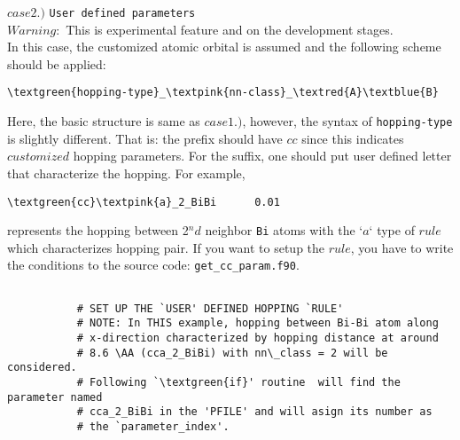\documentclass[a4paper,12pt]{scrartcl}
\newcommand{\textred}[1]{\textcolor{red!85!white}{\texttt{#1}}}
\newcommand{\textblue}[1]{\textcolor{blue!85!white}{\texttt{#1}}}
\newcommand{\textgreen}[1]{\textcolor{green!50!black}{\texttt{#1}}}
\newcommand{\textpink}[1]{\textcolor{red!60!yellow}{\texttt{#1}}}
\begin{document}
\begin{description}
		\subitem $case 2.)$  \texttt{User defined parameters} \\
		$Warning:$ This is experimental feature and on the development stages. \\
		In this case, the customized atomic orbital is assumed and the 
		following scheme should be applied:
        \begin{Verbatim}[commandchars=\\\{\}]
         \textgreen{hopping-type}_\textpink{nn-class}_\textred{A}\textblue{B}
        \end{Verbatim}
		Here, the basic structure is same as $case 1.)$, however, the syntax of 
		\textgreen{hopping-type} is slightly different. 
		That is: the prefix should have \textgreen{$cc$} since this indicates $customized$ 
		hopping parameters. For the suffix, one should put user defined 
		letter that characterize the hopping.	
		For example,
        \begin{Verbatim}[commandchars=\\\{\}]
         \textgreen{cc}\textpink{a}_2_BiBi      0.01
        \end{Verbatim}
		represents the hopping between 2$^nd$ neighbor \texttt{Bi} atoms with
		the `\textpink{$a$}` type of $rule$ which characterizes hopping pair.
		If you want to setup the $rule$, you have to write the conditions
		to the source code: \texttt{get\_cc\_param.f90}.


	
\begin{Verbatim}[commandchars=\\\{\},gobble=4, frame=single, framesep=2mm, 
    label= source code example: get\_cc\_param.f90,
    labelposition=bottomline]

		   # SET UP THE `USER' DEFINED HOPPING `RULE'
		   # NOTE: In THIS example, hopping between Bi-Bi atom along 
		   # x-direction characterized by hopping distance at around 
		   # 8.6 \AA (cca_2_BiBi) with nn\_class = 2 will be considered.
		   # Following `\textgreen{if}' routine  will find the parameter named 
		   # cca_2_BiBi in the 'PFILE' and will asign its number as 
		   # the `parameter_index'.


\end{Verbatim}
\end{description}
\end{document}
